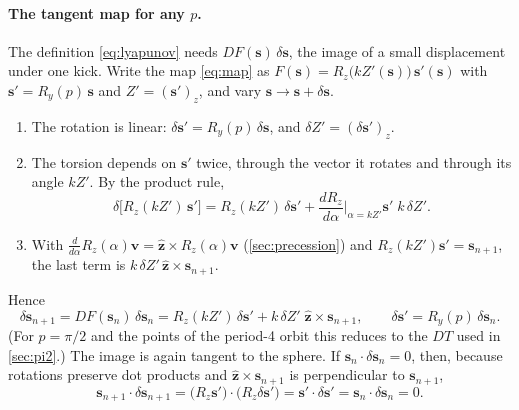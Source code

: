 \documentclass[11pt,a4paper]{article}
\newcommand{\vs}{\bm{s}}
\begin{document}
\paragraph{The tangent map for any $p$.} The definition \eqref{eq:lyapunov} needs $DF(\vs)\,\delta\vs$, the image of a
small displacement under one kick. Write the map \eqref{eq:map} as $F(\vs) = R_z\big(kZ'(\vs)\big)\,\vs'(\vs)$ with
$\vs' = R_y(p)\,\vs$ and $Z' = (\vs')_z$, and vary $\vs \to \vs + \delta\vs$.
\begin{enumerate}
  \item The rotation is linear: $\delta\vs' = R_y(p)\,\delta\vs$, and $\delta Z' = (\delta\vs')_z$.
  \item The torsion depends on $\vs'$ twice, through the vector it rotates and through its angle $kZ'$. By the
  product rule,
  \[ \delta\big[R_z(kZ')\,\vs'\big] = R_z(kZ')\,\delta\vs' + \frac{dR_z}{d\alpha}\Big|_{\alpha = kZ'}\vs'\;k\,\delta Z' . \]
  \item With $\frac{d}{d\alpha}R_z(\alpha)\bm v = \hat{\bm z}\times R_z(\alpha)\bm v$ (\cref{sec:precession}) and
  $R_z(kZ')\vs' = \vs_{n+1}$, the last term is $k\,\delta Z'\,\hat{\bm z}\times\vs_{n+1}$.
\end{enumerate}
Hence
\begin{equation}\label{eq:tangent}
  \boxed{\delta\vs_{n+1} = DF(\vs_n)\,\delta\vs_n = R_z(kZ')\,\delta\vs' + k\,\delta Z'\;\hat{\bm z}\times\vs_{n+1},
  \qquad \delta\vs' = R_y(p)\,\delta\vs_n .}
\end{equation}
(For $p = \pi/2$ and the points of the period-4 orbit this reduces to the $DT$ used in \cref{sec:pi2}.) The image is
again tangent to the sphere. If $\vs_n\cdot\delta\vs_n = 0$, then, because rotations preserve dot products and $\hat{\bm
z}\times\vs_{n+1}$ is perpendicular to $\vs_{n+1}$,
\begin{equation*}
  \vs_{n+1}\cdot\delta\vs_{n+1} = \big(R_z\vs'\big)\cdot\big(R_z\delta\vs'\big) = \vs'\cdot\delta\vs' = \vs_n\cdot\delta\vs_n = 0 .
\end{equation*}
\end{document}
